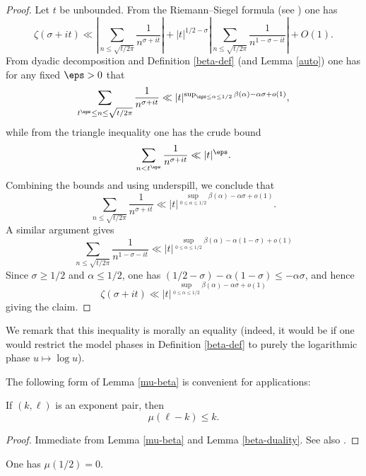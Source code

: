 \begin{proof}  Let $t$ be unbounded.  From the Riemann--Siegel formula (see \cite[Theorem 4.1]{ivic}) one has
    $$ \zeta(\sigma+it) \ll \left|\sum_{n \leq \sqrt{t/2\pi}} \frac{1}{n^{\sigma+it}}\right| + |t|^{1/2-\sigma} \left|\sum_{n \leq \sqrt{t/2\pi}} \frac{1}{n^{1-\sigma-it}}\right| + O(1).$$
From dyadic decomposition and Definition \ref{beta-def} (and Lemma \ref{auto}) one has for any fixed $\eps>0$ that
$$\sum_{t^\eps \leq n \leq \sqrt{t/2\pi}} \frac{1}{n^{\sigma+it}} \ll
|t|^{\sup_{\eps \leq \alpha \leq 1/2} \beta(\alpha) - \alpha \sigma + o(1)},$$
while from the triangle inequality one has the crude bound
$$\sum_{n < t^\eps} \frac{1}{n^{\sigma+it}} \ll |t|^\eps.$$
Combining the bounds and using underspill, we conclude that
$$\sum_{n \leq \sqrt{t/2\pi}} \frac{1}{n^{\sigma+it}} \ll
|t|^{\sup_{0 \leq \alpha \leq 1/2} \beta(\alpha) - \alpha \sigma + o(1)}.$$
A similar argument gives
$$\sum_{n \leq \sqrt{t/2\pi}} \frac{1}{n^{1-\sigma-it}} \ll
|t|^{\sup_{0 \leq \alpha \leq 1/2} \beta(\alpha) - \alpha (1-\sigma) + o(1)}$$
Since $\sigma \geq 1/2$ and $\alpha \leq 1/2$, one has $(1/2-\sigma) - \alpha(1-\sigma) \leq -\alpha \sigma$, and hence
$$ \zeta(\sigma+it) \ll
|t|^{\sup_{0 \leq \alpha \leq 1/2} \beta(\alpha) - \alpha \sigma + o(1)}$$
giving the claim.
\end{proof}

We remark that this inequality is morally an equality (indeed, it would be if one would restrict the model phases in Definition \ref{beta-def} to purely the logarithmic phase $u \mapsto \log u$).

The following form of Lemma \ref{mu-beta} is convenient for applications:

\begin{corollary}\label{exp-pair-mu} If $(k,\ell)$ is an exponent pair, then
$$ \mu(\ell-k) \leq k.$$
\end{corollary}


\begin{proof}  Immediate from Lemma \ref{mu-beta} and Lemma \ref{beta-duality}.  See also \cite[(7.57)]{ivic}.
\end{proof}

\begin{conjecture}\label{LH} One has $\mu(1/2)=0$.
\end{conjecture}

